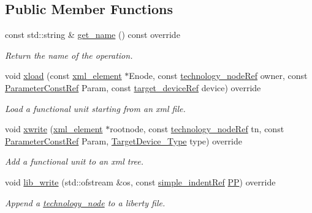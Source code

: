 \subsection*{Public Member Functions}
\begin{DoxyCompactItemize}
\item 
const std\+::string \& \hyperlink{structfunctional__unit__template_a135ff73a6ceafc2ebb4e662b8b13f34e}{get\+\_\+name} () const override
\begin{DoxyCompactList}\small\item\em Return the name of the operation. \end{DoxyCompactList}\item 
void \hyperlink{structfunctional__unit__template_a648a971318b6dc24eda5156d718443d5}{xload} (const \hyperlink{classxml__element}{xml\+\_\+element} $\ast$Enode, const \hyperlink{technology__node_8hpp_a33dd193b7bd6b987bf0d8a770a819fa7}{technology\+\_\+node\+Ref} owner, const \hyperlink{Parameter_8hpp_a37841774a6fcb479b597fdf8955eb4ea}{Parameter\+Const\+Ref} Param, const \hyperlink{target__device_8hpp_acedb2b7a617e27e6354a8049fee44eda}{target\+\_\+device\+Ref} device) override
\begin{DoxyCompactList}\small\item\em Load a functional unit starting from an xml file. \end{DoxyCompactList}\item 
void \hyperlink{structfunctional__unit__template_a3665d165eb3d912e2c46bf9e57006a40}{xwrite} (\hyperlink{classxml__element}{xml\+\_\+element} $\ast$rootnode, const \hyperlink{technology__node_8hpp_a33dd193b7bd6b987bf0d8a770a819fa7}{technology\+\_\+node\+Ref} tn, const \hyperlink{Parameter_8hpp_a37841774a6fcb479b597fdf8955eb4ea}{Parameter\+Const\+Ref} Param, \hyperlink{target__device_8hpp_a476becc690220f0805ce73006449c732}{Target\+Device\+\_\+\+Type} type) override
\begin{DoxyCompactList}\small\item\em Add a functional unit to an xml tree. \end{DoxyCompactList}\item 
void \hyperlink{structfunctional__unit__template_a1b4e1554138137039ed3048a042e5543}{lib\+\_\+write} (std\+::ofstream \&os, const \hyperlink{simple__indent_8hpp_ad85cff64e49d5dbf5cefe96f411c720e}{simple\+\_\+indent\+Ref} \hyperlink{structtechnology__node_ae6edfff0ccd2700b5de9fb538536977a}{PP}) override
\begin{DoxyCompactList}\small\item\em Append a \hyperlink{structtechnology__node}{technology\+\_\+node} to a liberty file. \end{DoxyCompactList}\item 

\end{DoxyCompactItemize}
